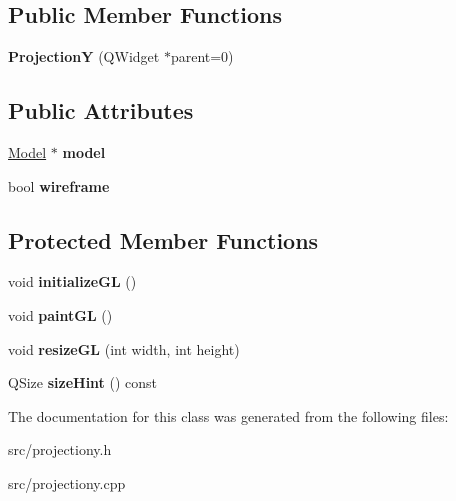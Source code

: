 \subsection*{Public Member Functions}
\begin{DoxyCompactItemize}
\item 
\mbox{\label{class_projection_y_ada83942857907322b5bad855f34ee893}} 
{\bfseries ProjectionY} (Q\+Widget $\ast$parent=0)
\end{DoxyCompactItemize}
\subsection*{Public Attributes}
\begin{DoxyCompactItemize}
\item 
\mbox{\label{class_projection_y_a5fef5122782e5ed50e7dd2f302628852}} 
\mbox{\hyperlink{class_model}{Model}} $\ast$ {\bfseries model}
\item 
\mbox{\label{class_projection_y_a8ac9c3d56c5dd9ca94afee7bfe4526d1}} 
bool {\bfseries wireframe}
\end{DoxyCompactItemize}
\subsection*{Protected Member Functions}
\begin{DoxyCompactItemize}
\item 
\mbox{\label{class_projection_y_aa241c90c6d57dedc345ce447de8b2062}} 
void {\bfseries initialize\+GL} ()
\item 
\mbox{\label{class_projection_y_ad71d2f89a6b30e2979d5cfe2af2a4128}} 
void {\bfseries paint\+GL} ()
\item 
\mbox{\label{class_projection_y_a0e2001d9ee85afa0ce1ad8b2b8f15ad7}} 
void {\bfseries resize\+GL} (int width, int height)
\item 
\mbox{\label{class_projection_y_a8d502c7b1fc7cb5c894a84f10fba7368}} 
Q\+Size {\bfseries size\+Hint} () const
\end{DoxyCompactItemize}


The documentation for this class was generated from the following files\+:\begin{DoxyCompactItemize}
\item 
src/projectiony.\+h\item 
src/projectiony.\+cpp\end{DoxyCompactItemize}
